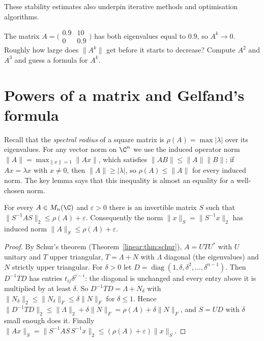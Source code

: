 These stability estimates also underpin iterative methods and optimisation algorithms.

\begin{think}
The matrix $A=\bigl(\begin{smallmatrix}0.9&10\\0&0.9\end{smallmatrix}\bigr)$ has both eigenvalues equal to $0.9$, so $A^k\to0$. Roughly
how large does $\|A^k\|$ get before it starts to decrease? Compute $A^2$ and $A^3$ and guess a formula for $A^k$.
\end{think}

\section{Powers of a matrix and Gelfand's formula}

Recall that the \emph{spectral radius} of a square matrix is $\rho(A)=\max|\lambda|$ over its eigenvalues. For any vector norm on
$\C^n$ we use the induced operator norm $\|A\|=\max_{\|x\|=1}\|Ax\|$, which satisfies $\|AB\|\le\|A\|\|B\|$; if $Ax=\lambda x$ with
$x\ne0$, then $\|A\|\ge|\lambda|$, so $\rho(A)\le\|A\|$ for every induced norm. The key lemma says that this inequality is almost an
equality for a well-chosen norm.

\begin{lemma}\label{linear:lem:adaptednorm}
For every $A\in M_n(\C)$ and $\varepsilon>0$ there is an invertible matrix $S$ such that $\|S^{-1}AS\|_2\le\rho(A)+\varepsilon$.
Consequently the norm $\|x\|_S=\|S^{-1}x\|_2$ has induced norm $\|A\|_S\le\rho(A)+\varepsilon$.
\end{lemma}
\begin{proof}
By Schur's theorem (Theorem~\ref{linear:thm:schur}), $A=UTU^*$ with $U$ unitary and $T$ upper triangular, $T=\Lambda+N$ with
$\Lambda$ diagonal (the eigenvalues) and $N$ strictly upper triangular. For $\delta>0$ let $D=\operatorname{diag}(1,\delta,\delta^2,
\dots,\delta^{n-1})$. Then $D^{-1}TD$ has entries $t_{ij}\delta^{j-i}$: the diagonal is unchanged and every entry above it is
multiplied by at least $\delta$. So $D^{-1}TD=\Lambda+N_\delta$ with $\|N_\delta\|_2\le\|N_\delta\|_F\le\delta\|N\|_F$ for $\delta\le1$.
Hence $\|D^{-1}TD\|_2\le\|\Lambda\|_2+\delta\|N\|_F=\rho(A)+\delta\|N\|_F$, and $S=UD$ with $\delta$ small enough does it. Finally
$\|Ax\|_S=\|S^{-1}AS\,S^{-1}x\|_2\le(\rho(A)+\varepsilon)\|x\|_S$.
\end{proof}

